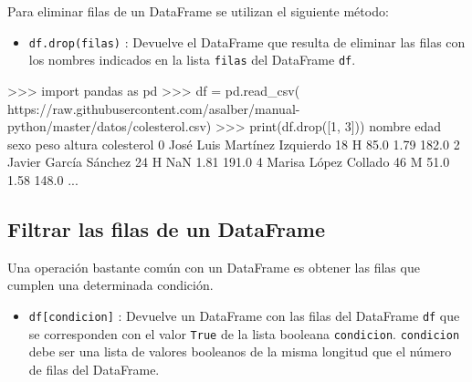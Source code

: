 \documentclass[
  spanish,
  a4paper,
]{scrreport}
\newenvironment{Shaded}{\begin{snugshade}}{\end{snugshade}}
\newcommand{\BuiltInTok}[1]{\textcolor[rgb]{0.00,0.23,0.31}{#1}}
\newcommand{\DecValTok}[1]{\textcolor[rgb]{0.68,0.00,0.00}{#1}}
\newcommand{\FloatTok}[1]{\textcolor[rgb]{0.68,0.00,0.00}{#1}}
\newcommand{\ImportTok}[1]{\textcolor[rgb]{0.00,0.46,0.62}{#1}}
\newcommand{\NormalTok}[1]{\textcolor[rgb]{0.00,0.23,0.31}{#1}}
\newcommand{\OperatorTok}[1]{\textcolor[rgb]{0.37,0.37,0.37}{#1}}
\newcommand{\StringTok}[1]{\textcolor[rgb]{0.13,0.47,0.30}{#1}}
\providecommand{\tightlist}{%
  \setlength{\itemsep}{0pt}\setlength{\parskip}{0pt}}
\begin{document}
Para eliminar filas de un DataFrame se utilizan el siguiente método:

\begin{itemize}
\tightlist
\item
  \texttt{df.drop(filas)} : Devuelve el DataFrame que resulta de
  eliminar las filas con los nombres indicados en la lista
  \texttt{filas} del DataFrame \texttt{df}.
\end{itemize}

\begin{Shaded}
\begin{Highlighting}[]
\OperatorTok{\textgreater{}\textgreater{}\textgreater{}} \ImportTok{import}\NormalTok{ pandas }\ImportTok{as}\NormalTok{ pd}
\OperatorTok{\textgreater{}\textgreater{}\textgreater{}}\NormalTok{ df }\OperatorTok{=}\NormalTok{ pd.read\_csv(}
\StringTok{\textquotesingle{}https://raw.githubusercontent.com/asalber/manual{-}python/master/datos/colesterol.csv\textquotesingle{}}\NormalTok{)}
\OperatorTok{\textgreater{}\textgreater{}\textgreater{}} \BuiltInTok{print}\NormalTok{(df.drop([}\DecValTok{1}\NormalTok{, }\DecValTok{3}\NormalTok{]))}
\NormalTok{                              nombre  edad sexo   peso  altura  colesterol}
\DecValTok{0}\NormalTok{       José Luis Martínez Izquierdo    }\DecValTok{18}\NormalTok{    H   }\FloatTok{85.0}    \FloatTok{1.79}       \FloatTok{182.0}
\DecValTok{2}\NormalTok{              Javier García Sánchez    }\DecValTok{24}\NormalTok{    H    NaN    }\FloatTok{1.81}       \FloatTok{191.0}
\DecValTok{4}\NormalTok{               Marisa López Collado    }\DecValTok{46}\NormalTok{    M   }\FloatTok{51.0}    \FloatTok{1.58}       \FloatTok{148.0}
\NormalTok{...}
\end{Highlighting}
\end{Shaded}

\subsection{Filtrar las filas de un
DataFrame}\label{filtrar-las-filas-de-un-dataframe}

Una operación bastante común con un DataFrame es obtener las filas que
cumplen una determinada condición.

\begin{itemize}
\tightlist
\item
  \texttt{df{[}condicion{]}} : Devuelve un DataFrame con las filas del
  DataFrame \texttt{df} que se corresponden con el valor \texttt{True}
  de la lista booleana \texttt{condicion}. \texttt{condicion} debe ser
  una lista de valores booleanos de la misma longitud que el número de
  filas del DataFrame.
\end{itemize}
\end{document}
